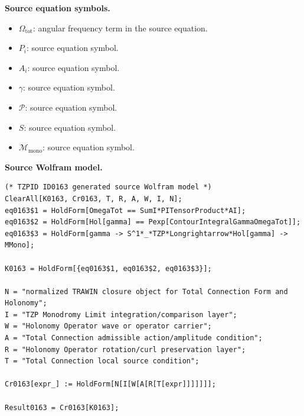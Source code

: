 \begin{minipage}[t]{0.49\linewidth}
\begingroup
\small
\raggedright
\textbf{Source equation symbols.}\par
\begin{itemize}[leftmargin=1.35em,itemsep=1pt,topsep=1pt,parsep=0pt]
    \item $\Omega_{\mathrm{tot}}$: angular frequency term in the source equation.
    \item $P_i$: source equation symbol.
    \item $A_i$: source equation symbol.
    \item $\gamma$: source equation symbol.
    \item $\mathcal{P}$: source equation symbol.
    \item $S$: source equation symbol.
    \item $\mathcal{M}_{\mathrm{mono}}$: source equation symbol.
\end{itemize}
\endgroup
\end{minipage}\hfill
\begin{minipage}[t]{0.47\linewidth}
\begingroup
\scriptsize
\raggedright
\textbf{Source Wolfram model.}\par
\begin{Verbatim}[fontsize=\tiny,breaklines=true,breakanywhere=true]
(* TZPID ID0163 generated source Wolfram model *)
ClearAll[K0163, Cr0163, T, R, A, W, I, N];
eq0163$1 = HoldForm[OmegaTot == SumI*PITensorProduct*AI];
eq0163$2 = HoldForm[Hol[gamma] == Pexp[ContourIntegralGammaOmegaTot]];
eq0163$3 = HoldForm[gamma -> S^1*_*TZP*Longrightarrow*Hol[gamma] -> MMono];

K0163 = HoldForm[{eq0163$1, eq0163$2, eq0163$3}];

N = "normalized TRAWIN closure object for Total Connection Form and Holonomy";
I = "TZP Monodromy Limit integration/comparison layer";
W = "Holonomy Operator wave or operator carrier";
A = "Total Connection admissible action/amplitude condition";
R = "Holonomy Operator rotation/curl preservation layer";
T = "Total Connection local source condition";

Cr0163[expr_] := HoldForm[N[I[W[A[R[T[expr]]]]]]];

Result0163 = Cr0163[K0163];
\end{Verbatim}
\endgroup
\end{minipage}

